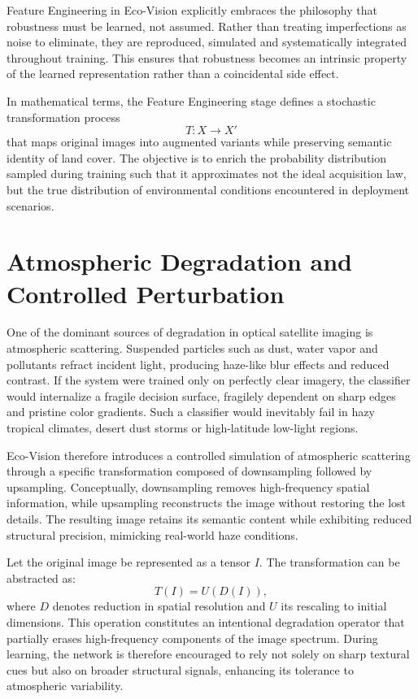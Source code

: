 \documentclass[12pt,a4paper]{report}
\begin{document}
Feature Engineering in Eco-Vision explicitly embraces the philosophy that robustness must be learned, not assumed. Rather than treating imperfections as noise to eliminate, they are reproduced, simulated and systematically integrated throughout training. This ensures that robustness becomes an intrinsic property of the learned representation rather than a coincidental side effect.

In mathematical terms, the Feature Engineering stage defines a stochastic transformation process
\[
T: X \rightarrow X'
\]
that maps original images into augmented variants while preserving semantic identity of land cover. The objective is to enrich the probability distribution sampled during training such that it approximates not the ideal acquisition law, but the true distribution of environmental conditions encountered in deployment scenarios.

\section{Atmospheric Degradation and Controlled Perturbation}

One of the dominant sources of degradation in optical satellite imaging is atmospheric scattering. Suspended particles such as dust, water vapor and pollutants refract incident light, producing haze-like blur effects and reduced contrast. If the system were trained only on perfectly clear imagery, the classifier would internalize a fragile decision surface, fragilely dependent on sharp edges and pristine color gradients. Such a classifier would inevitably fail in hazy tropical climates, desert dust storms or high-latitude low-light regions.

Eco-Vision therefore introduces a controlled simulation of atmospheric scattering through a specific transformation composed of downsampling followed by upsampling. Conceptually, downsampling removes high-frequency spatial information, while upsampling reconstructs the image without restoring the lost details. The resulting image retains its semantic content while exhibiting reduced structural precision, mimicking real-world haze conditions.

Let the original image be represented as a tensor \( I \). The transformation can be abstracted as:
\[
T(I) = U(D(I)),
\]
where \( D \) denotes reduction in spatial resolution and \( U \) its rescaling to initial dimensions. This operation constitutes an intentional degradation operator that partially erases high-frequency components of the image spectrum. During learning, the network is therefore encouraged to rely not solely on sharp textural cues but also on broader structural signals, enhancing its tolerance to atmospheric variability.
\end{document}
